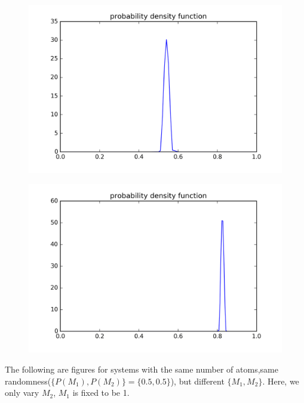\begin{figure}[!htbh]
\centering
\begin{minipage}{.45\textwidth}
  \centering
  \includegraphics[width=1.1\linewidth]{Harmonic_mass_ratio/densProb_0_5N_101m_2p_98th.png}
  \label{fig:mass length101 98th}
\end{minipage}\qquad
\begin{minipage}{.45\textwidth}
  \centering
  \includegraphics[width=1.1\linewidth]{Harmonic_mass_ratio/densProb_0_5N_201m_2p_198th.png}
  \label{fig:mass length201 198th}
\end{minipage}
\end{figure}

\newpage
The following are figures for systems with the same number of atoms,same randomness($\{P(M_1),P(M_2) \}= \{0.5,0.5\} $), but different $\{M_1, M_2\}$. Here, we only vary $M_2$, $M_1$ is fixed to be 1. 

